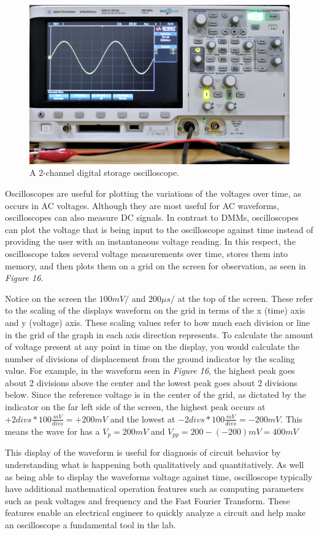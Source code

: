 \documentclass[12pt]{article}
\begin{document}
\begin{figure}[H]
    \centering
    \includegraphics[width=15cm]{photos/prelim/oscilloscope.jpg}
    \caption{A 2-channel digital storage oscilloscope.}
\end{figure}

Oscilloscopes are useful for plotting the variations of the voltages over time, as occurs in AC voltages. Although they are most useful for AC waveforms, oscilloscopes can also measure DC signals. In contrast to DMMs, oscilloscopes can plot the voltage that is being input to the oscilloscope against time instead of providing the user with an instantaneous voltage reading. In this respect, the oscilloscope takes several voltage measurements over time, stores them into memory, and then plots them on a grid on the screen for observation, as seen in \textit{Figure 16}. 

Notice on the screen the $100mV/$ and $200\mu s/$ at the top of the screen. These refer to the scaling of the displays waveform on the grid in terms of the x (time) axis and y (voltage) axis. These scaling values refer to how much each division or line in the grid of the graph in each axis direction represents. To calculate the amount of voltage present at any point in time on the display, you would calculate the number of divisions of displacement from the ground indicator by the scaling value. For example, in the waveform seen in \textit{Figure 16}, the highest peak goes about 2 divisions above the center and the lowest peak goes about 2 divisions below. Since the reference voltage is in the center of the grid, as dictated by the indicator on the far left side of the screen, the highest peak occurs at $+2 divs * 100\frac{mV}{divs} = +200mV$ and the lowest at $-2 divs * 100\frac{mV}{divs} = -200mV$. This means the wave for has a $V_p = 200mV$ and $V_{pp} = 200 - (-200) mV = 400 mV$

This display of the waveform is useful for diagnosis of circuit behavior by understanding what is happening both qualitatively and quantitatively. As well as being able to display the waveforms voltage against time, oscilloscope typically have additional mathematical operation features such as computing parameters such as peak voltages and frequency and the Fast Fourier Transform. These features enable an electrical engineer to quickly analyze a circuit and help make an oscilloscope a fundamental tool in the lab.
\end{document}
